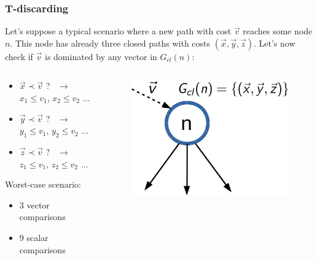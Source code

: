 \begin{frame}
\frametitle{T-discarding}
	Let's suppose a typical scenario where a new path with cost $\vec v$ reaches some node $n$. This node \textcolor{ao}{has already three closed paths} with costs $(\vec x, \vec y, \vec z)$. Let's now \textcolor{ao}{check if $\vec v$ is dominated} by any vector in $G_{cl}(n)$:
	\vspace{5mm}
	\begin{columns}%
	\begin{example}
	\vspace{1mm}
	\begin{itemize}
		\item $\vec x \prec \vec v$ ? \ $\rightarrow$ \ $x_1 \leq v_1$, $x_2 \leq v_2$ ...
		\item $\vec y \prec \vec v$ ? \ $\rightarrow$ \ $y_1 \leq v_1$, $y_2 \leq v_2$ ...
		\item $\vec z \prec \vec v$ ? \ $\rightarrow$ \ $z_1 \leq v_1$, $z_2 \leq v_2$ ...
	\end{itemize}
	Worst-case scenario: \\ 
	\begin{itemize}
		\item 3 vector comparisons
		\item 9 scalar comparisons
	\end{itemize}
	\end{example}
	\begin{figure}
    	\centering
		\includegraphics[scale=0.45]{figs/t-discarding}
	\end{figure}
	\end{columns}
\note{}
\end{frame}	

